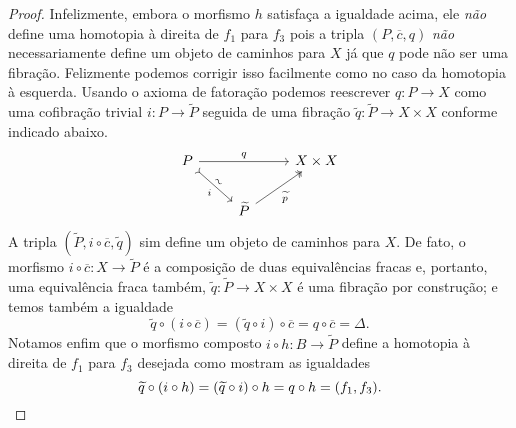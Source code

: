\begin{proof}
  Infelizmente, embora o morfismo $h$ satisfaça a igualdade acima, ele \emph{não} define uma homotopia à direita de $f_{1}$ para $f_{3}$ pois a tripla $(P,\overline{c},q)$ \emph{não} necessariamente define um objeto de caminhos para $X$ já que $q$ pode não ser uma fibração.
  Felizmente podemos corrigir isso facilmente como no caso da homotopia à esquerda.
  Usando o axioma de fatoração podemos reescrever $q: P \to X$ como uma cofibração trivial $i: P \to \widetilde{P}$ seguida de uma fibração $\widetilde{q}: \widetilde{P} \to X \times X$ conforme indicado abaixo.
  \begin{displaymath}
    \begin{tikzcd}
      P
      \arrow[rr, "q"]
      \arrow[rd, tail, "i" {swap}, "\sim" {sloped}]
      & & X \times X
      \\ & \widetilde{P}
      \arrow[ru, two heads, "\widetilde{p}" swap]
    \end{tikzcd}
  \end{displaymath}
  A tripla $(\widetilde{P},i \circ \overline{c},\widetilde{q})$ sim define um objeto de caminhos para $X$.
  De fato, o morfismo $i \circ \overline{c}: X \to \widetilde{P}$ é a composição de duas equivalências fracas e, portanto, uma equivalência fraca também, $\widetilde{q}: \widetilde{P} \to X \times X$ é uma fibração por construção; e temos também a igualdade
  \begin{displaymath}
    \widetilde{q} \circ (i \circ \overline{c}) = (\widetilde{q} \circ i) \circ \overline{c} = q \circ \overline{c} = \Delta.
  \end{displaymath}
  Notamos enfim que o morfismo composto $i \circ h: B \to \widetilde{P}$ define a homotopia à direita de $f_{1}$ para $f_{3}$ desejada como mostram as igualdades
  \begin{displaymath}
    \widetilde{q} \circ (i \circ h) = (\widetilde{q} \circ i) \circ h = q \circ h = (f_{1},f_{3}). \qedhere
  \end{displaymath}
\end{proof}


